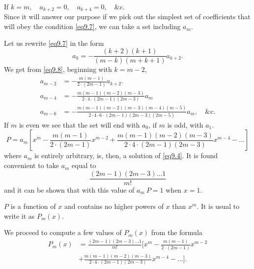 \documentclass[oneside,12pt]{book}
\begin{document}
If \hspace{4cm} $k=m,\quad a_{k+2}=0,\quad a_{k+4}=0,\quad \&c.$ \\
Since it will answer our purpose if we pick out the simplest set of coefficients that will obey the condition \eqref{eq9.7}, we can take a set including $a_m$. \par 

Let us rewrite \eqref{eq9.7} in the form 
\begin{equation}
    a_k=-\frac{(k+2)(k+1)}{(m-k)(m+k+1)}a_{k+2}.
    \label{eq9.8}
\end{equation}
We get from \eqref{eq9.8}, beginning with $k=m-2$, 
\begin{align*}
    a_{m-2}&=-\frac{m(m-1)}{2\cdot(2m-1)}a_{k+2}. \\
    a_{m-4}&=-\frac{m(m-1)(m-2)(m-3)}{2\cdot4\cdot(2m-1)(2m-3)}a_m \\
    a_{m-6}&=-\frac{m(m-1)(m-2)(m-3)(m-4)(m-5)}{2\cdot4\cdot6\cdot(2m-1)(2m-3)(2m-5)}a_m,\quad \text{\&c.}
\end{align*}
If $m$ is even we see that the set will end with $a_0$, if $m$ is odd, with $a_1$. 
$$P=a_m\left[x^m-\frac{m(m-1)}{2\cdot(2m-1)}x^{m-2}+\frac{m(m-1)(m-2)(m-3)}{2\cdot4\cdot(2m-1)(2m-3)}x^{m-4}-\dots\right]$$
where $a_m$ is entirely arbitrary, is, then, a solution of \eqref{eq9.4}. It is found convenient to take $a_m$ equal to 
$$\frac{(2m-1)(2m-3)\dots1}{m!}$$
and it can be shown that with this value of $a_m\ P=1$ when $x=1$. \par 

$P$ is a function of $x$ and contains no higher powers of $x$ than $x^m$. It is usual to write it as $P_m(x)$. \par 

We proceed to compute a few values of $P_m(x)$ from the formula 
\begin{equation}
    \begin{split}
    P_m(x)&=\frac{(2m-1)(2m-3)\dots1}{m!}\biggl[x^m-\frac{m(m-1)}{2\cdot(2m-1)}x^{m-2} \\
    &+\frac{m(m-1)(m-2)(m-3)}{2\cdot4\cdot(2m-1)(2m-3)}x^{m-4}-\dots\biggr].
    \label{eq9.9}
    \end{split}
\end{equation} \par 
\end{document}
